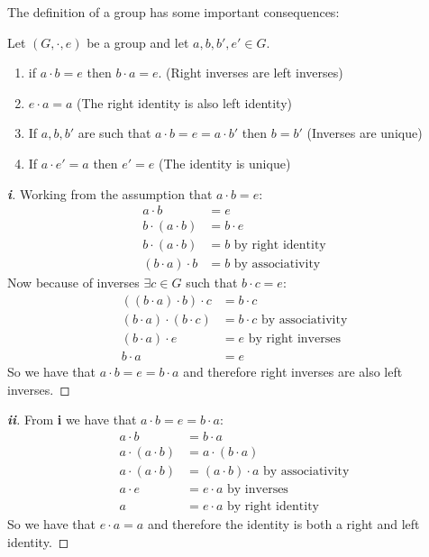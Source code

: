 \documentclass[../main.tex]{subfiles}
\begin{document}
The definition of a group has some important consequences:
\begin{proposition}
  Let $(G, \cdot, e)$ be a group and let $a, b, b', e' \in G$.
  \begin{enumerate}
    \item if $a \cdot b = e$ then $b \cdot a = e$. (Right inverses are left inverses)
    \item $e \cdot a = a$ (The right identity is also left identity)
    \item If $a, b, b'$ are such that $a \cdot b = e = a \cdot b'$ then $b = b'$ (Inverses are unique)
    \item If $a \cdot e' = a$ then $e' = e$ (The identity is unique)
  \end{enumerate}
\end{proposition}
\begin{proof}[\textbf{i}]
  Working from the assumption that $a \cdot b = e$:
  \begin{align*}
    a \cdot b &= e \\
    b \cdot (a \cdot b) &= b \cdot e \\
    b \cdot (a \cdot b) &= b \text{ by right identity} \\
    (b \cdot a) \cdot b &= b \text{ by associativity}
  \end{align*} 
  Now because of inverses $\exists c \in G$ such that $b \cdot c = e$:
  \begin{align*}
    ((b \cdot a) \cdot b) \cdot c &= b \cdot c \\
    (b \cdot a) \cdot (b \cdot c) & = b \cdot c \text{ by associativity}\\
    (b \cdot a) \cdot e &= e \text{ by right inverses}\\
    b \cdot a &= e
  \end{align*}
  So we have that $a \cdot b = e = b \cdot a$ and therefore right inverses are also left inverses.
\end{proof}
\begin{proof}[\textbf{ii}]
  From \textbf{i} we have that $a \cdot b = e = b \cdot a$:
  \begin{align*}
    a \cdot b &= b \cdot a \\
    a \cdot (a \cdot b) &= a \cdot (b \cdot a) \\
    a \cdot (a \cdot b) &= (a \cdot b) \cdot a \text{ by associativity}\\
    a \cdot e &= e \cdot a \text{ by inverses}\\
    a &= e \cdot a \text{ by right identity}
  \end{align*}
  So we have that $e \cdot a = a$ and therefore the identity is both a right and left identity.
\end{proof}
\end{document}
